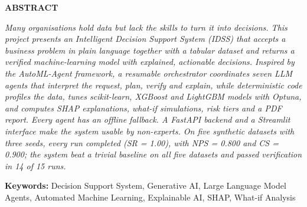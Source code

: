 \clearpage
{}
\begin{center}
{\normalfont\bfseries\fontsize{14}{17}\selectfont ABSTRACT\par}
\end{center}
\vspace{28pt}
\noindent \textit{Many organisations hold data but lack the skills to turn it into decisions. This project presents an Intelligent Decision Support System (IDSS) that accepts a business problem in plain language together with a tabular dataset and returns a verified machine-learning model with explained, actionable decisions. Inspired by the AutoML-Agent framework, a resumable orchestrator coordinates seven LLM agents that interpret the request, plan, verify and explain, while deterministic code profiles the data, tunes scikit-learn, XGBoost and LightGBM models with Optuna, and computes SHAP explanations, what-if simulations, risk tiers and a PDF report. Every agent has an offline fallback. A FastAPI backend and a Streamlit interface make the system usable by non-experts. On five synthetic datasets with three seeds, every run completed (SR = 1.00), with NPS = 0.800 and CS = 0.900; the system beat a trivial baseline on all five datasets and passed verification in 14 of 15 runs.}\par
\vspace{12pt}
\noindent \textbf{Keywords:} Decision Support System, Generative AI, Large Language Model Agents, Automated Machine Learning, Explainable AI, SHAP, What-if Analysis\par
